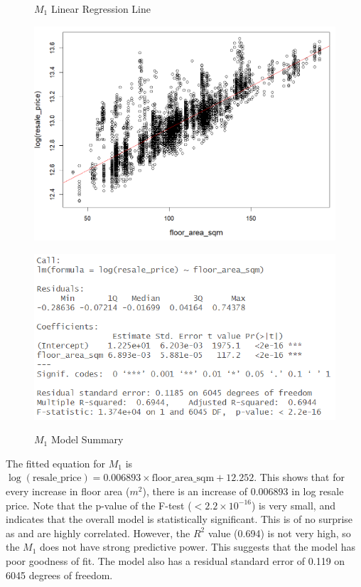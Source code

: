 \begin{figure}[!htp]
\centering
\begin{minipage}[t]{0.45\textwidth}
  \centering
  \caption{$M_1$ Linear Regression Line}
  \label{fig: m1 plotted}
  \includegraphics[width=\textwidth]{images/Screenshot 2023-04-11 201739.png}
\end{minipage}\hfill
\begin{minipage}[t]{0.49\textwidth}
  \centering
  \caption{$M_1$ Model Summary}
  \includegraphics[width=\textwidth]{images/Screenshot 2023-04-11 201612.png}
  \label{fig: m1 model summary}
\end{minipage}
\end{figure}


The fitted equation for $M_1$ is $\log(\text{resale\_price}) = 0.006893 \times \text{floor\_area\_sqm} + 12.252$. This shows that for every increase in floor area ($m^2$), there is an increase of 0.006893 in log resale price. Note that the p-value of the F-test ($< 2.2 \times 10^{-16}$) is very small, and indicates that the overall model is statistically significant. This is of no surprise as  and  are highly correlated. However, the $R^2$ value (0.694) is not very high, so the $M_1$ does not have strong predictive power. This suggests that the model has poor goodness of fit. The model also has a residual standard error of 0.119 on 6045 degrees of freedom.

